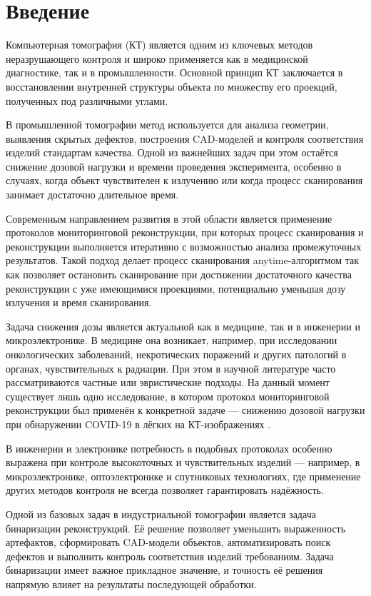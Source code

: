 \section*{Введение}

Компьютерная томография (КТ) является одним из ключевых методов неразрушающего контроля и широко применяется как в медицинской диагностике, так и в промышленности. Основной принцип КТ заключается в восстановлении внутренней структуры объекта по множеству его проекций, полученных под различными углами.

В промышленной томографии метод используется для анализа геометрии, выявления скрытых дефектов, построения CAD-моделей и контроля соответствия изделий стандартам качества. Одной из важнейших задач при этом остаётся снижение дозовой нагрузки и времени проведения эксперимента, особенно в случаях, когда объект чувствителен к излучению или когда процесс сканирования занимает достаточно длительное время.

Современным направлением развития в этой области является применение протоколов мониторинговой реконструкции, при которых процесс сканирования и реконструкции выполняется итеративно с возможностью анализа промежуточных результатов. Такой подход делает процесс сканирования anytime-алгоритмом так как позволяет остановить сканирование при достижении достаточного качества реконструкции с уже имеющимися проекциями, потенциально уменьшая дозу излучения и время сканирования.

Задача снижения дозы является актуальной как в медицине, так и в инженерии и микроэлектронике. В медицине она возникает, например, при исследовании онкологических заболеваний, некротических поражений и других патологий в органах, чувствительных к радиации. При этом в научной литературе часто рассматриваются частные или эвристические подходы. На данный момент существует лишь одно исследование, в котором протокол мониторинговой реконструкции был применён к конкретной задаче — снижению дозовой нагрузки при обнаружении COVID-19 в лёгких на КТ-изображениях \cite{bulatov2023reducing}.

В инженерии и электронике потребность в подобных протоколах особенно выражена при контроле высокоточных и чувствительных изделий — например, в микроэлектронике, оптоэлектронике и спутниковых технологиях, где применение других методов контроля не всегда позволяет гарантировать надёжность.

Одной из базовых задач в индустриальной томографии является задача бинаризации реконструкций. Её решение позволяет уменьшить выраженность артефактов, сформировать CAD-модели объектов, автоматизировать поиск дефектов и выполнить контроль соответствия изделий требованиям. Задача бинаризации имеет важное прикладное значение, и точность её решения напрямую влияет на результаты последующей обработки.

